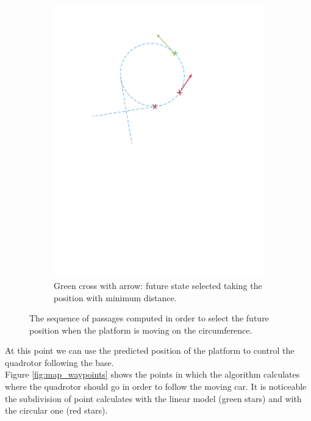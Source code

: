 \begin{itemize}
\begin{figure}[!htbp]
\begin{subfigure}[b]{0.45\textwidth}
        \includegraphics[width=\textwidth]{img/circular_movment8.pdf}
        \caption{Green cross with arrow: future state selected taking the position with minimum distance.}
        \label{fig:eight}
   \end{subfigure}
  \caption{The sequence of passages computed in order to select the future position when the platform is moving on the circumference.}
  \label{fig:sequence_find_next_position_circumference}
\end{figure} 
\end{itemize}

At this point we can use the predicted position of the platform to control the quadrotor following the base.\\

Figure \ref{fig:map_waypoints} shows the points in which the algorithm calculates where the quadrotor should go in order to follow the moving car. It is noticeable the subdivision of point calculates with the linear model (green stars) and with the circular one (red stars).

